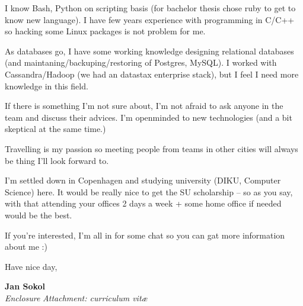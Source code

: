 \documentclass[11pt]{article}
\begin{document}
I know Bash, Python on scripting basis (for bachelor thesis chose ruby to get to know new language). I have few years experience with programming in C/C++ so hacking some Linux packages is not problem for me.

As databases go, I have some working knowledge designing relational databases (and maintaning/backuping/restoring of Postgres, MySQL). I worked with Cassandra/Hadoop (we had an datastax enterprise stack), but I feel I need more knowledge in this field.

If there is something I'm not sure about, I'm not afraid to ask anyone in the team and discuss their advices. I'm openminded to new technologies (and a bit skeptical at the same time.)

Travelling is my passion so meeting people from teams in other cities will always be thing I'll look forward to.

I'm settled down in Copenhagen and studying university (DIKU, Computer Science) here. It would be really nice to get the SU scholarship -- so as you say, with that attending your offices 2 days a week + some home office if needed would be the best.

If you're interested, I'm all in for some chat so you can gat more information about me :)

Have nice day,

{\bfseries Jan Sokol}\\
%
\vfill%
{\slshape Enclosure}
{\slshape Attachment: curriculum vit\ae{}}
\end{document}
